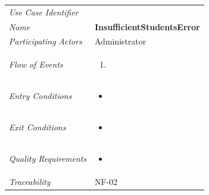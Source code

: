 \documentclass[12pt,letterpaper]{article}
\begin{document}
\begin{center}
	\begin{tabu} to 
		\toprule
		Use Case Identifier & \insufficientstudentserror{} \\
		Name & {\bf InsufficientStudentsError} \\
		Participating Actors & Administrator \\
		Flow of Events & 
	    \begin{enumerate}[topsep=-1em,leftmargin=*]
		    \item 
		\end{enumerate} \\

		Entry Conditions &
		\begin{itemize}[topsep=-1em,leftmargin=*]
		    \item 
        \end{itemize} \\

		Exit Conditions &
		\begin{itemize}[topsep=-1em,leftmargin=*]
		    \item 
        \end{itemize} \\

		Quality Requirements &
		\begin{itemize}[topsep=-1em,leftmargin=*]
		    \item 
        \end{itemize} \\

		Traceability & NF-02 \\
		\toprule
	\end{tabu}
\end{center}
\end{document}
